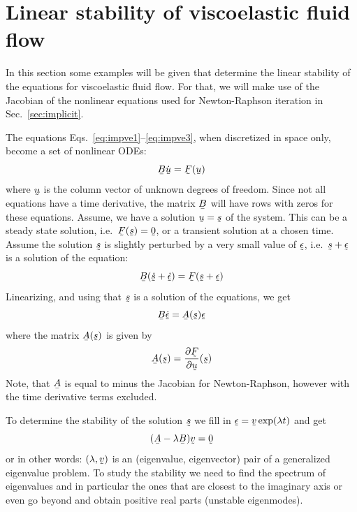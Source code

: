 
\def\headdate{1st November 2023}

\section{Linear stability of viscoelastic fluid flow}
\label{sec:linearstability}

In this section some examples will be given that determine the linear stability
of the equations for viscoelastic fluid flow. For that, we will make use of the
Jacobian of the nonlinear equations used for Newton-Raphson iteration in
Sec.~\ref{sec:implicit}.

The equations Eqs.~\eqref{eq:impve1}--\eqref{eq:impve3}, when discretized in space only, become a set of nonlinear ODEs:
\begin{equation}
  \mat B\col{\dot u} = \col F(\col u)
\end{equation}
where $\col u$ is the column vector of unknown degrees of freedom. Since not all equations have a time derivative, the matrix $\mat B$ will have rows with zeros for these equations. Assume, we have a solution $\col u=\col{s}$ of the system. This can be a steady state solution, i.e.\ $\col F(\col{s})=\col 0$, or a transient solution at a chosen time. Assume the solution $\col{s}$ is slightly perturbed by a very small value of $\col\epsilon$, i.e.\ $\col{s}+\col\epsilon$ is a solution of the equation:
\begin{equation}
  \mat B(\col{\dot{s}} +\col{\dot\epsilon}) = \col F(\col{s}+\col\epsilon)
\end{equation}
Linearizing, and using that $\col{s}$ is a solution of the equations, we get
\begin{equation}
 \mat B\col{\dot\epsilon} = \mat A(\col{s})\col\epsilon
\end{equation}
where the matrix $\mat A(\col{s})$ is given by
\begin{equation}
 \mat A(\col{s}) = \pderiv{\col F}{\col u}(\col{s})
\end{equation}
Note, that $\mat A$ is equal to minus the Jacobian for Newton-Raphson, however with the time derivative terms excluded.

To determine the stability of the solution $\col s$ we fill in $\col\epsilon=\col v\exp(\lambda t)$ and get
\begin{equation}
    (\mat A - \lambda \mat B ) \col v =\col 0
\end{equation}
or in other words: $(\lambda,\col v)$ is an (eigenvalue, eigenvector) pair of a generalized eigenvalue problem. To study the stability we need to find the spectrum of eigenvalues and in particular the ones that are closest to the imaginary axis or even go beyond and obtain positive real parts (unstable eigenmodes). 

